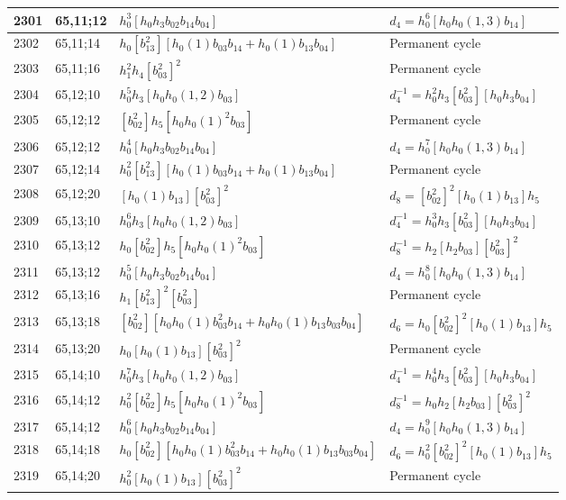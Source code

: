 \documentclass{article}
\begin{document}
\begin{longtable}{|l|l|>{\raggedright\arraybackslash}p{6cm}|>{\raggedright\arraybackslash}p{6cm}|}
2301 & 65,11;12 & $h_0^3[h_0h_3b_{02}b_{14}b_{04}]$ &$d_{4}=h_0^6[h_0h_0(1, 3)b_{14}]$\\
\hline
2302 & 65,11;14 & $h_0[b_{13}^2][h_0(1)b_{03}b_{14} + h_0(1)b_{13}b_{04}]$ & Permanent cycle\\
\hline
2303 & 65,11;16 & $h_1^2h_4[b_{03}^2]^2$ & Permanent cycle\\
\hline
2304 & 65,12;10 & $h_0^5h_3[h_0h_0(1, 2)b_{03}]$ & $d_{4}^{-1}=h_0^2h_3[b_{03}^2][h_0h_3b_{04}]$\\
\hline
2305 & 65,12;12 & $[b_{02}^2]h_5[h_0h_0(1)^2b_{03}]$ & Permanent cycle\\
2306 & 65,12;12 & $h_0^4[h_0h_3b_{02}b_{14}b_{04}]$ &$d_{4}=h_0^7[h_0h_0(1, 3)b_{14}]$\\
\hline
2307 & 65,12;14 & $h_0^2[b_{13}^2][h_0(1)b_{03}b_{14} + h_0(1)b_{13}b_{04}]$ & Permanent cycle\\
\hline
2308 & 65,12;20 & $[h_0(1)b_{13}][b_{03}^2]^2$ &$d_{8}=[b_{02}^2]^2[h_0(1)b_{13}]h_5$\\
\hline
2309 & 65,13;10 & $h_0^6h_3[h_0h_0(1, 2)b_{03}]$ & $d_{4}^{-1}=h_0^3h_3[b_{03}^2][h_0h_3b_{04}]$\\
\hline
2310 & 65,13;12 & $h_0[b_{02}^2]h_5[h_0h_0(1)^2b_{03}]$ & $d_{8}^{-1}=h_2[h_2b_{03}][b_{03}^2]^2$\\
2311 & 65,13;12 & $h_0^5[h_0h_3b_{02}b_{14}b_{04}]$ &$d_{4}=h_0^8[h_0h_0(1, 3)b_{14}]$\\
\hline
2312 & 65,13;16 & $h_1[b_{13}^2]^2[b_{03}^2]$ & Permanent cycle\\
\hline
2313 & 65,13;18 & $[b_{02}^2][h_0h_0(1)b_{03}^2b_{14} + h_0h_0(1)b_{13}b_{03}b_{04}]$ &$d_{6}=h_0[b_{02}^2]^2[h_0(1)b_{13}]h_5$\\
\hline
2314 & 65,13;20 & $h_0[h_0(1)b_{13}][b_{03}^2]^2$ & Permanent cycle\\
\hline
2315 & 65,14;10 & $h_0^7h_3[h_0h_0(1, 2)b_{03}]$ & $d_{4}^{-1}=h_0^4h_3[b_{03}^2][h_0h_3b_{04}]$\\
\hline
2316 & 65,14;12 & $h_0^2[b_{02}^2]h_5[h_0h_0(1)^2b_{03}]$ & $d_{8}^{-1}=h_0h_2[h_2b_{03}][b_{03}^2]^2$\\
2317 & 65,14;12 & $h_0^6[h_0h_3b_{02}b_{14}b_{04}]$ &$d_{4}=h_0^9[h_0h_0(1, 3)b_{14}]$\\
\hline
2318 & 65,14;18 & $h_0[b_{02}^2][h_0h_0(1)b_{03}^2b_{14} + h_0h_0(1)b_{13}b_{03}b_{04}]$ &$d_{6}=h_0^2[b_{02}^2]^2[h_0(1)b_{13}]h_5$\\
\hline
2319 & 65,14;20 & $h_0^2[h_0(1)b_{13}][b_{03}^2]^2$ & Permanent cycle\\

\end{longtable}
\end{document}
